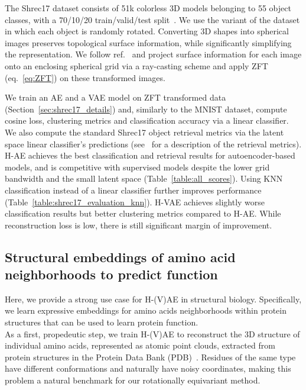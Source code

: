 The Shrec17 dataset consists of 51k colorless 3D models belonging to 55 object classes, with a
70/10/20 train/valid/test split~\cite{noauthor_shrec_nodate}. We use the variant of the dataset in
which each object is randomly rotated. Converting 3D shapes into spherical images preserves
topological surface information, while significantly simplifying the representation. We follow
ref.~\cite{cohen_spherical_2018} 
and project surface information for each image onto an enclosing spherical grid via a ray-casting
scheme and apply ZFT (eq.~\ref{eq:ZFT}) on these transformed images.

We train an AE and a VAE model on ZFT transformed data (Section~\ref{sec:shrec17_details}) and,
similarly to the MNIST dataset, compute cosine loss, clustering metrics and classification
accuracy via a linear classifier. We also compute the standard Shrec17 object retrieval metrics via
the latent space linear classifier's predictions (see~\cite{noauthor_shrec_nodate} for a
description of the retrieval metrics). H-AE achieves the best classification and retrieval results
for autoencoder-based models, and is competitive with supervised models despite the lower grid
bandwidth and the small latent space (Table~\ref{table:all_scores}). Using KNN classification
instead of a linear classifier further improves performance
(Table~\ref{table:shrec17_evaluation_knn}). H-VAE achieves slightly worse classification results
but better clustering metrics compared to H-AE. While reconstruction loss is low, there is still
significant margin of improvement. 

\subsection{Structural  embeddings of amino acid neighborhoods to predict function}
Here, we provide a strong use case for H-(V)AE in structural biology. 
Specifically, we learn expressive embeddings for amino acids neighborhoods within protein
structures that can be used to learn protein function.\\

  As a first, propedeutic step, we
train H-(V)AE to reconstruct the 3D structure of individual amino acids, represented as atomic
point clouds, extracted from protein structures in the Protein Data Bank
(PDB)~\cite{berman_protein_2000}. Residues of the same type have different conformations and
naturally have noisy coordinates, making this problem a natural benchmark for our rotationally
equivariant method. 

